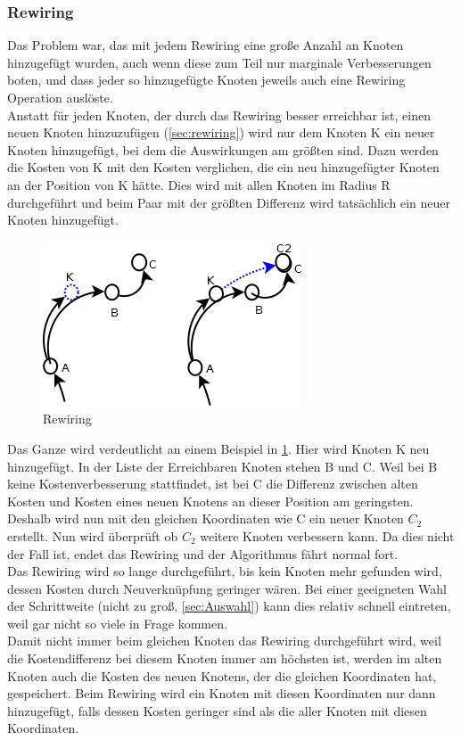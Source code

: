 \subsubsection{Rewiring}
Das Problem war, das mit jedem Rewiring eine große Anzahl an Knoten hinzugefügt wurden, auch wenn diese zum Teil nur marginale Verbesserungen boten, und dass jeder so hinzugefügte Knoten jeweils auch eine Rewiring Operation auslöste.\\
Anstatt für jeden Knoten, der durch das Rewiring besser erreichbar ist, einen neuen Knoten hinzuzufügen (\ref{sec:rewiring}) wird nur dem Knoten K ein neuer Knoten hinzugefügt, bei dem die Auswirkungen am größten sind. Dazu werden die Kosten von K mit den Kosten verglichen, die ein neu hinzugefügter Knoten an der Position von K hätte. Dies wird mit allen Knoten im Radius R durchgeführt und beim Paar mit der größten Differenz wird tatsächlich ein neuer Knoten hinzugefügt. \\
\begin{figure}
\label{fig:rewiring4}
\centering
\includegraphics[scale=1]{Bilder/Rewiring.png} 
\caption{Rewiring}
\end{figure}
Das Ganze wird verdeutlicht an einem Beispiel in \ref{fig:rewiring4}. Hier wird Knoten K neu hinzugefügt. In der Liste der Erreichbaren Knoten stehen B und C. Weil bei B keine Kostenverbesserung stattfindet, ist bei C die Differenz zwischen alten Kosten und Kosten eines neuen Knotens an dieser Position am geringsten. Deshalb wird nun mit den gleichen Koordinaten wie C ein neuer Knoten $C_2$ erstellt. Nun wird überprüft ob $C_2$ weitere Knoten verbessern kann. Da dies nicht der Fall ist, endet das Rewiring und der Algorithmus fährt normal fort.\\
Das Rewiring wird so lange durchgeführt, bis kein Knoten mehr gefunden wird, dessen Kosten durch Neuverknüpfung geringer wären. Bei einer geeigneten Wahl der Schrittweite (nicht zu groß, \ref{sec:Auswahl}) kann dies relativ schnell eintreten, weil gar nicht so viele in Frage kommen. \\
Damit nicht immer beim gleichen Knoten das Rewiring durchgeführt wird, weil die Kostendifferenz bei diesem Knoten immer am höchsten ist, werden im alten Knoten auch die Kosten des neuen Knotens, der die gleichen Koordinaten hat, gespeichert. Beim Rewiring wird ein Knoten mit diesen Koordinaten nur dann hinzugefügt, falls dessen Kosten geringer sind als die aller Knoten mit diesen Koordinaten.

